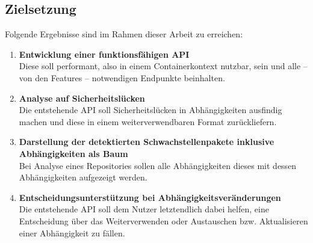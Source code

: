 \subsection{Zielsetzung} \label{sec:Zielsetzung}
    Folgende Ergebnisse sind im Rahmen dieser Arbeit zu erreichen:
    \begin{enumerate}
        \item \textbf{Entwicklung einer funktionsfähigen \ac{API}} \\
            Diese soll performant, also in einem Containerkontext nutzbar, sein und alle -- von den Features -- notwendigen Endpunkte beinhalten.
        \item \textbf{Analyse auf Sicherheitslücken} \\
            Die entstehende \ac{API} soll Sicherheitslücken in Abhängigkeiten ausfindig machen und diese in einem weiterverwendbaren Format zurückliefern.
        \item \textbf{Darstellung der detektierten Schwachstellenpakete inklusive Abhängigkeiten als Baum} \\
            Bei Analyse eines Repositories sollen alle Abhängigkeiten dieses mit dessen Abhängigkeiten aufgezeigt werden.
        \item \textbf{Entscheidungsunterstützung bei Abhängigkeitsveränderungen} \\
            Die entstehende \ac{API} soll dem Nutzer letztendlich dabei helfen, eine Entscheidung über das Weiterverwenden oder Austauschen bzw. Aktualisieren einer Abhängigkeit zu fällen.
    \end{enumerate}